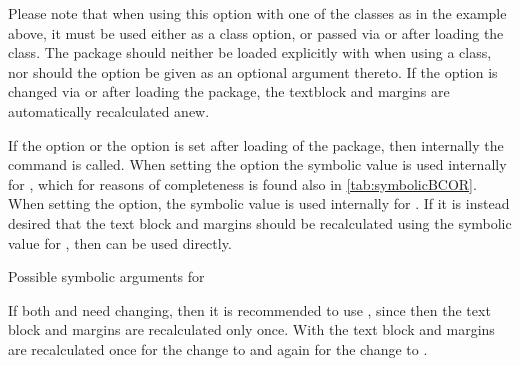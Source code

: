 Please note that when using this option with one of the {\KOMAScript} classes
as in the example above, it must be used either as a class option, or passed
via  or
 after loading the class. The
 package should neither be loaded explicitly with
 when using a {\KOMAScript} class, nor
should the option be given as an optional argument thereto. If the option is
changed via  or
 after loading the package, the textblock
and margins are automatically recalculated anew.%
%
\EndIndexGroup


\begin{Declaration}
\end{Declaration}%
\begin{Explain}
  If the  option or the
   option is set after loading of the
   package, then internally the command  is
  called. When setting the  option the symbolic
  value  is used internally for , which for
  reasons of completeness is found also in \autoref{tab:symbolicBCOR}. When
  setting the  option, the symbolic value
   is used internally for . If it is instead desired
  that the text block and margins should be recalculated using the symbolic
  value  for , then
   can be used
  directly.
\end{Explain}

\begin{table}
  \caption[{Symoblic  arguments for
    }]{Possible symbolic  arguments for
    }
  \label{tab:symbolicBCOR}
  \begin{desctabular}
  \end{desctabular}
\end{table}

If both  and  need changing, then it is recommended to
use , since then the text block and margins are recalculated
only once. With
%
 the text block and
margins are recalculated once for the change to  and again for the
change to .

